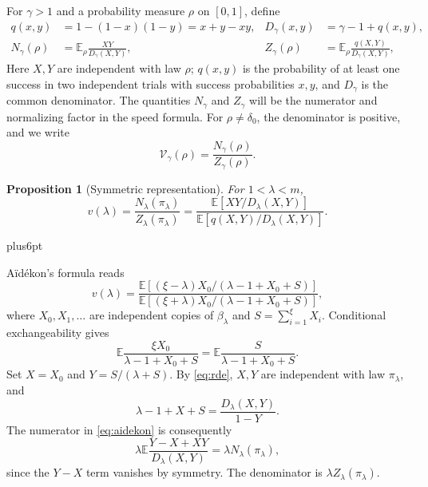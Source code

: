 \documentclass[11pt,reqno]{amsart}
\makeatletter
\theoremstyle{plain}
\newtheorem{proposition}[theorem]{Proposition}
\theoremstyle{definition}
\theoremstyle{remark}
\renewenvironment{proof}[1][\proofname]{%
  \par
  \pushQED{\qed}%
  \normalfont
  \topsep6pt plus6pt\relax
  \trivlist
  \item[\hskip\labelsep\slshape #1\@addpunct{.}]%
  \ignorespaces
}{%
  \popQED
  \endtrivlist
  \@endpefalse
}
\DeclareRobustCommand{\qed}{%
  \leavevmode\unskip\penalty9999\hbox{}\nobreak
  \ifmmode
    \makebox[0pt][l]{\qquad\hbox{\qedsymbol}}%
  \else
    \qquad\hbox{\qedsymbol}%
  \fi
}
\renewcommand{\qedsymbol}{\rule[.47pt]{4pt}{6pt}}
\numberwithin{equation}{section}
\newcommand{\E}{\mathbb E}
\makeatother
\begin{document}
For $\gamma>1$ and a probability measure $\rho$ on $[0,1]$, define
\begin{align}
 q(x,y)&=1-(1-x)(1-y)=x+y-xy,
 & D_\gamma(x,y)&=\gamma-1+q(x,y),\label{eq:kernels}\\
 N_\gamma(\rho)&=\E_\rho\frac{XY}{D_\gamma(X,Y)},
 & Z_\gamma(\rho)&=\E_\rho\frac{q(X,Y)}{D_\gamma(X,Y)},\label{eq:NZ}
\end{align}
Here $X,Y$ are independent with law $\rho$; $q(x,y)$ is the probability
of at least one success in two independent trials with success
probabilities $x,y$, and $D_\gamma$ is the common denominator.
The quantities $N_\gamma$ and $Z_\gamma$ will be the numerator and
normalizing factor in the speed formula.
For $\rho\ne\delta_0$, the denominator is positive, and we write
\begin{equation}\label{eq:speed-functional}
 \mathcal V_\gamma(\rho)=\frac{N_\gamma(\rho)}{Z_\gamma(\rho)}.
\end{equation}

\begin{proposition}[Symmetric representation]\label{prop:symmetric}
For $1<\lambda<m$,
\begin{equation}\label{eq:symmetric-speed}
 v(\lambda)=\frac{N_\lambda(\pi_\lambda)}{Z_\lambda(\pi_\lambda)}
 =\frac{\E[XY/D_\lambda(X,Y)]}
       {\E[q(X,Y)/D_\lambda(X,Y)]}.
\end{equation}
\end{proposition}

\begin{proof}
A\"id\'ekon's formula \cite[Theorem~1.1]{Aidekon} reads
\begin{equation}\label{eq:aidekon}
 v(\lambda)=
 \frac{\E[(\xi-\lambda)X_0/(\lambda-1+X_0+S)]}
      {\E[(\xi+\lambda)X_0/(\lambda-1+X_0+S)]},
\end{equation}
where $X_0,X_1,\ldots$ are independent copies of $\beta_\lambda$ and
$S=\sum_{i=1}^{\xi}X_i$. Conditional exchangeability gives
\begin{equation}\label{eq:exchange-speed}
 \E\frac{\xi X_0}{\lambda-1+X_0+S}
 =\E\frac{S}{\lambda-1+X_0+S}.
\end{equation}
Set $X=X_0$ and $Y=S/(\lambda+S)$. By \eqref{eq:rde}, $X,Y$ are independent
with law $\pi_\lambda$, and
\begin{equation}\label{eq:denom-change}
 \lambda-1+X+S=\frac{D_\lambda(X,Y)}{1-Y}.
\end{equation}
The numerator in \eqref{eq:aidekon} is consequently
\[
 \lambda\E\frac{Y-X+XY}{D_\lambda(X,Y)}
 =\lambda N_\lambda(\pi_\lambda),
\]
since the $Y-X$ term vanishes by symmetry. The denominator is
$\lambda Z_\lambda(\pi_\lambda)$.
\end{proof}
\end{document}
